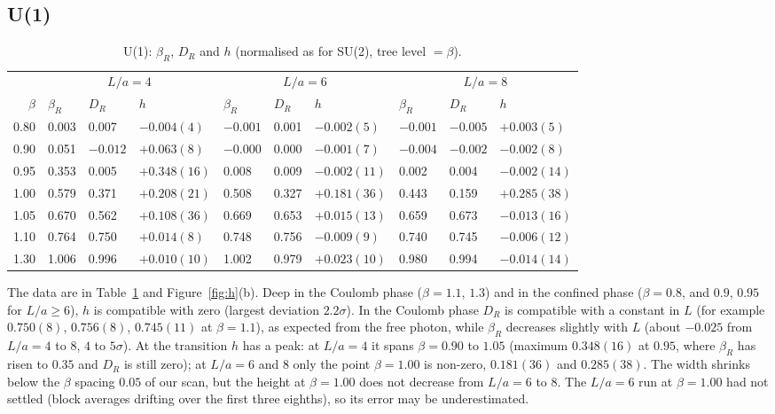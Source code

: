 \documentclass[11pt,a4paper]{article}
\theoremstyle{definition}
\theoremstyle{remark}
\newcommand{\bR}{\beta_R}
\newcommand{\DR}{D_R}
\begin{document}
\subsection{U(1)}

\begin{table}[ht]\centering\small
\caption{U(1): $\bR$, $\DR$ and $h$ (normalised as for SU(2), tree level $=\beta$).}\label{tab:u1}
\begin{tabular}{@{}rlllllllll@{}}\toprule
 & \multicolumn{3}{c}{$L/a=4$} & \multicolumn{3}{c}{$L/a=6$} & \multicolumn{3}{c}{$L/a=8$}\\
$\beta$ & $\bR$ & $\DR$ & $h$ & $\bR$ & $\DR$ & $h$ & $\bR$ & $\DR$ & $h$\\\midrule
0.80 & 0.003 & 0.007 & $-0.004(4)$ & $-0.001$ & 0.001 & $-0.002(5)$ & $-0.001$ & $-0.005$ & $+0.003(5)$\\
0.90 & 0.051 & $-0.012$ & $+0.063(8)$ & $-0.000$ & 0.000 & $-0.001(7)$ & $-0.004$ & $-0.002$ & $-0.002(8)$\\
0.95 & 0.353 & 0.005 & $+0.348(16)$ & 0.008 & 0.009 & $-0.002(11)$ & 0.002 & 0.004 & $-0.002(14)$\\
1.00 & 0.579 & 0.371 & $+0.208(21)$ & 0.508 & 0.327 & $+0.181(36)$ & 0.443 & 0.159 & $+0.285(38)$\\
1.05 & 0.670 & 0.562 & $+0.108(36)$ & 0.669 & 0.653 & $+0.015(13)$ & 0.659 & 0.673 & $-0.013(16)$\\
1.10 & 0.764 & 0.750 & $+0.014(8)$ & 0.748 & 0.756 & $-0.009(9)$ & 0.740 & 0.745 & $-0.006(12)$\\
1.30 & 1.006 & 0.996 & $+0.010(10)$ & 1.002 & 0.979 & $+0.023(10)$ & 0.980 & 0.994 & $-0.014(14)$\\\bottomrule
\end{tabular}
\end{table}

The data are in Table~\ref{tab:u1} and Figure~\ref{fig:h}(b). Deep in the Coulomb phase ($\beta=1.1$, $1.3$) and in the confined phase ($\beta=0.8$, and $0.9$, $0.95$ for $L/a\ge6$), $h$ is compatible with zero (largest deviation $2.2\sigma$). In the Coulomb phase $\DR$ is compatible with a constant in $L$ (for example $0.750(8)$, $0.756(8)$, $0.745(11)$ at $\beta=1.1$), as expected from the free photon, while $\bR$ decreases slightly with $L$ (about $-0.025$ from $L/a=4$ to $8$, $4$ to $5\sigma$). At the transition $h$ has a peak: at $L/a=4$ it spans $\beta=0.90$ to $1.05$ (maximum $0.348(16)$ at $0.95$, where $\bR$ has risen to $0.35$ and $\DR$ is still zero); at $L/a=6$ and $8$ only the point $\beta=1.00$ is non-zero, $0.181(36)$ and $0.285(38)$. The width shrinks below the $\beta$ spacing $0.05$ of our scan, but the height at $\beta=1.00$ does not decrease from $L/a=6$ to $8$. The $L/a=6$ run at $\beta=1.00$ had not settled (block averages drifting over the first three eighths), so its error may be underestimated.
\end{document}
